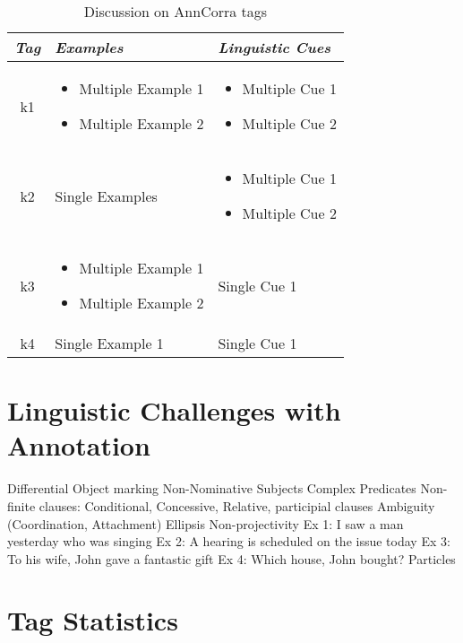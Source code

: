 \documentclass[a4 paper]{article}
\begin{document}
\begin{table}[h]
\centering
\begin{tabular}{|c|p{}|p{}|}
\hline
\textit{Tag} & \textit{Examples} & \textit{Linguistic Cues} \\ 
\hline
k1 & \begin{itemize} 
  \item Multiple Example 1
  \item Multiple Example 2
  \end{itemize}
  & \begin{itemize} 
  \item Multiple Cue 1
  \item Multiple Cue 2
  \end{itemize} \\
  \hline
k2 & Single Examples & \begin{itemize} 
  \item Multiple Cue 1
  \item Multiple Cue 2
  \end{itemize} \\
  \hline
k3 & \begin{itemize} 
  \item Multiple Example 1
  \item Multiple Example 2
  \end{itemize}
  & Single Cue 1 \\
  \hline
k4 & Single Example 1 & Single Cue 1 \\
\hline
\end{tabular}
\caption{Discussion on AnnCorra tags}
\end{table}


\section{Linguistic Challenges with Annotation}

 Differential Object marking
 Non-Nominative Subjects
 Complex Predicates
 Non-finite clauses: Conditional, Concessive, Relative, participial clauses
 Ambiguity (Coordination, Attachment)
 Ellipsis
 Non-projectivity
	Ex 1: I saw a man yesterday who was singing
	Ex 2: A hearing is scheduled on the issue today
	Ex 3: To his wife, John gave a fantastic gift
	Ex 4: Which house, John bought?
 Particles

\section{Tag Statistics}
\end{document}
